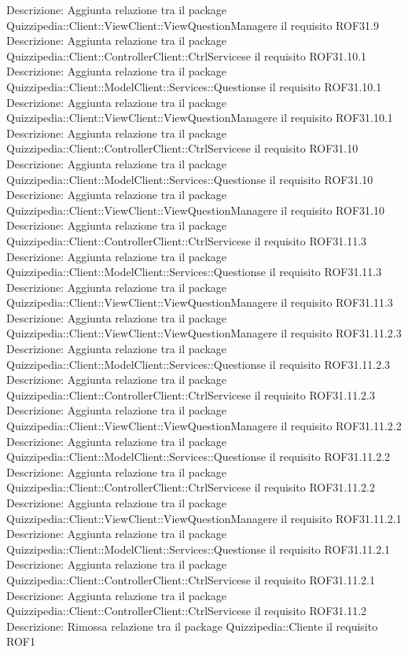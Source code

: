 Descrizione: Aggiunta relazione tra il package Quizzipedia::Client::ViewClient::ViewQuestionManagere il requisito ROF31.9 
Descrizione: Aggiunta relazione tra il package Quizzipedia::Client::ControllerClient::CtrlServicese il requisito ROF31.10.1 
Descrizione: Aggiunta relazione tra il package Quizzipedia::Client::ModelClient::Services::Questionse il requisito ROF31.10.1 
Descrizione: Aggiunta relazione tra il package Quizzipedia::Client::ViewClient::ViewQuestionManagere il requisito ROF31.10.1 
Descrizione: Aggiunta relazione tra il package Quizzipedia::Client::ControllerClient::CtrlServicese il requisito ROF31.10 
Descrizione: Aggiunta relazione tra il package Quizzipedia::Client::ModelClient::Services::Questionse il requisito ROF31.10 
Descrizione: Aggiunta relazione tra il package Quizzipedia::Client::ViewClient::ViewQuestionManagere il requisito ROF31.10 
Descrizione: Aggiunta relazione tra il package Quizzipedia::Client::ControllerClient::CtrlServicese il requisito ROF31.11.3 
Descrizione: Aggiunta relazione tra il package Quizzipedia::Client::ModelClient::Services::Questionse il requisito ROF31.11.3 
Descrizione: Aggiunta relazione tra il package Quizzipedia::Client::ViewClient::ViewQuestionManagere il requisito ROF31.11.3 
Descrizione: Aggiunta relazione tra il package Quizzipedia::Client::ViewClient::ViewQuestionManagere il requisito ROF31.11.2.3 
Descrizione: Aggiunta relazione tra il package Quizzipedia::Client::ModelClient::Services::Questionse il requisito ROF31.11.2.3 
Descrizione: Aggiunta relazione tra il package Quizzipedia::Client::ControllerClient::CtrlServicese il requisito ROF31.11.2.3 
Descrizione: Aggiunta relazione tra il package Quizzipedia::Client::ViewClient::ViewQuestionManagere il requisito ROF31.11.2.2 
Descrizione: Aggiunta relazione tra il package Quizzipedia::Client::ModelClient::Services::Questionse il requisito ROF31.11.2.2 
Descrizione: Aggiunta relazione tra il package Quizzipedia::Client::ControllerClient::CtrlServicese il requisito ROF31.11.2.2 
Descrizione: Aggiunta relazione tra il package Quizzipedia::Client::ViewClient::ViewQuestionManagere il requisito ROF31.11.2.1 
Descrizione: Aggiunta relazione tra il package Quizzipedia::Client::ModelClient::Services::Questionse il requisito ROF31.11.2.1 
Descrizione: Aggiunta relazione tra il package Quizzipedia::Client::ControllerClient::CtrlServicese il requisito ROF31.11.2.1 
Descrizione: Aggiunta relazione tra il package Quizzipedia::Client::ControllerClient::CtrlServicese il requisito ROF31.11.2 
Descrizione: Rimossa relazione tra il package Quizzipedia::Cliente il requisito ROF1 
